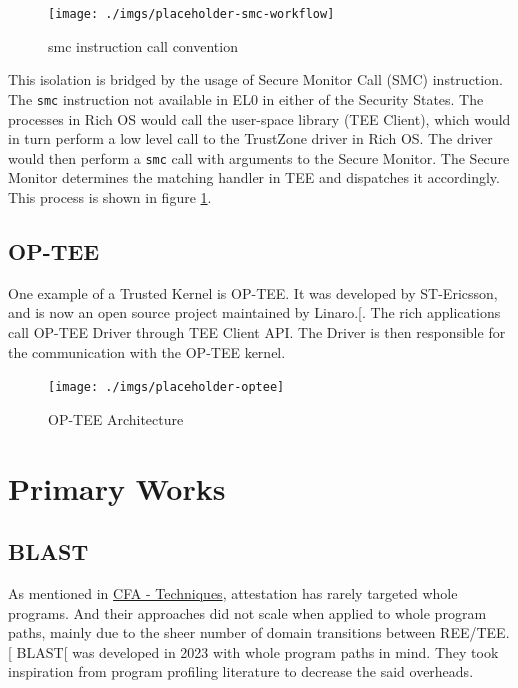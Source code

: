 \documentclass[a4paper, nobind]{templates/ociamthesis}
\begin{document}
\begin{figure}[H]

{\centering \texttt{[image: ./imgs/placeholder-smc-workflow]} 

}

\caption{smc instruction call convention}\label{fig:smc-convention}
\end{figure}

This isolation is bridged by the usage of Secure Monitor Call (SMC) instruction.
The \texttt{smc} instruction not available in EL0 in either of the Security States.
The processes in Rich OS would call the user-space library (TEE Client),
which would in turn perform a low level call to the TrustZone driver in Rich OS.
The driver would then perform a \texttt{smc} call with arguments to the Secure Monitor.
The Secure Monitor determines the matching handler in TEE and dispatches it accordingly.
This process is shown in figure \ref{fig:smc-convention}.

\subsection{OP-TEE}\label{op-tee}

One example of a Trusted Kernel is OP-TEE. It was developed by ST-Ericsson,
and is now an open source project maintained by Linaro.{[}\citeproc{ref-optee}{17}{]}.
The rich applications call OP-TEE Driver through TEE Client API. The Driver
is then responsible for the communication with the OP-TEE kernel.

\begin{figure}[H]

{\centering \texttt{[image: ./imgs/placeholder-optee]} 

}

\caption{OP-TEE Architecture}\label{fig:optee-arch}
\end{figure}

\section{Primary Works}\label{primary-works}

\subsection{BLAST}\label{blast}

As mentioned in \hyperref[cfatechniques]{CFA - Techniques}, attestation has rarely targeted whole programs.
And their approaches did not scale when applied to whole program paths, mainly
due to the sheer number of domain transitions between REE/TEE.{[}\citeproc{ref-blast}{25}{]}
BLAST{[}\citeproc{ref-blast}{25}{]} was developed in 2023 with whole program paths in mind.
They took inspiration from program profiling literature to decrease the said overheads.
\end{document}
